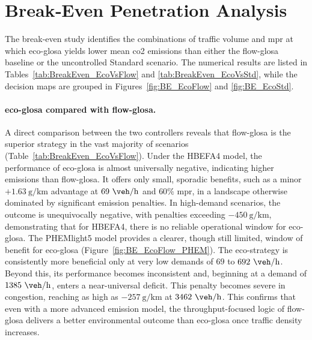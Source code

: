 \section{Break‐Even Penetration Analysis}
\label{sec:Results_BreakEven}

The break-even study identifies the combinations of traffic volume and \ac{mpr} at which \ac{eco-glosa} yields lower mean \ac{co2} emissions than either the \ac{flow-glosa} baseline or the uncontrolled Standard scenario. The numerical results are listed in Tables~\vref{tab:BreakEven_EcoVsFlow} and \vref{tab:BreakEven_EcoVsStd}, while the decision maps are grouped in Figures~\vref{fig:BE_EcoFlow} and \vref{fig:BE_EcoStd}.

\paragraph{\ac{eco-glosa} compared with \ac{flow-glosa}.}
A direct comparison between the two controllers reveals that \ac{flow-glosa} is the superior strategy in the vast majority of scenarios (Table~\vref{tab:BreakEven_EcoVsFlow}). Under the HBEFA4 model, the performance of \ac{eco-glosa} is almost universally negative, indicating higher emissions than \ac{flow-glosa}. It offers only small, sporadic benefits, such as a minor $+1.63~\unit{\gram\per\kilo\metre}$ advantage at $69~\unit{\veh\per\hour}$ and $60\%$ \ac{mpr}, in a landscape otherwise dominated by significant emission penalties. In high-demand scenarios, the outcome is unequivocally negative, with penalties exceeding $-450~\unit{\gram\per\kilo\metre}$, demonstrating that for HBEFA4, there is no reliable operational window for \ac{eco-glosa}.
\mynewline
The PHEMlight5 model provides a clearer, though still limited, window of benefit for \ac{eco-glosa} (Figure~\vref{fig:BE_EcoFlow_PHEM}). The eco-strategy is consistently more beneficial only at very low demands of $69$ to $692~\unit{\veh\per\hour}$. Beyond this, its performance becomes inconsistent and, beginning at a demand of $1385~\unit{\veh\per\hour}$, enters a near-universal deficit. This penalty becomes severe in congestion, reaching as high as $-257~\unit{\gram\per\kilo\metre}$ at $3462~\unit{\veh\per\hour}$. This confirms that even with a more advanced emission model, the throughput-focused logic of \ac{flow-glosa} delivers a better environmental outcome than \ac{eco-glosa} once traffic density increases.

